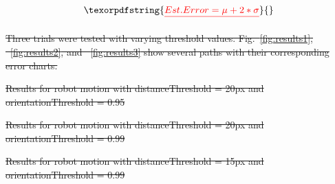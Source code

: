 \documentclass[12pt,american]{report}
\providecommand{\DIFdeltex}[1]{{\protect\color{red}\sout{#1}}}                      %
\providecommand{\DIFdelFL}[1]{\DIFdel{#1}} %
\providecommand{\DIFdel}[1]{\texorpdfstring{\DIFdeltex{#1}}{}} %
\begin{document}
\begin{displaymath}
\DIFdel{Est. Error = \mu + 2*\sigma 
}\end{displaymath}

\DIFdel{Three trials were tested with varying threshold values.  Fig.~\ref{fig:results1}, ~\ref{fig:results2}, and ~\ref{fig:results3} show several paths with their corresponding error charts.  }%

{%
\DIFdelFL{Results for robot motion with distanceThreshold = 20px and orientationThreshold = 0.95}}

{%
\DIFdelFL{Results for robot motion with distanceThreshold = 20px and orientationThreshold = 0.99}}

{%
\DIFdelFL{Results for robot motion with distanceThreshold = 15px and orientationThreshold = 0.99}}
\end{document}
